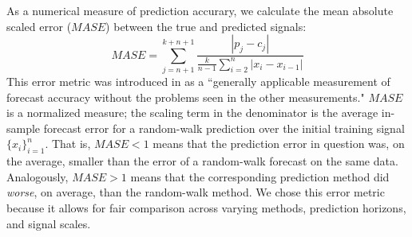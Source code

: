 As a numerical measure of prediction accurary, we calculate the mean
absolute scaled error ($MASE$) between the true and predicted signals:
% 
$$MASE = \sum_{j=n+1}^{k+n+1}\frac{|p_j-c_j|
}{\frac{k}{n-1}\sum^n_{i=2}|x_{i}-x_{i-1}|}$$
% 
This error metric was introduced in \cite{MASE} as a ``generally
applicable measurement of forecast accuracy without the problems seen
in the other measurements."  $MASE$ is a normalized measure; the
scaling term in the denominator
% 
% 
is the average in-sample forecast error for a random-walk prediction
over the initial training signal $\{x_i\}^n_{i=1}$.  That is, $MASE<1$ means that the
prediction error in question was, on the average, smaller than the
error of a random-walk forecast on the same data.  Analogously,
$MASE>1$ means that the corresponding prediction method did
\emph{worse}, on average, than the random-walk method.  We chose this
error metric because it allows for fair comparison across varying
methods, prediction horizons, and signal scales.

